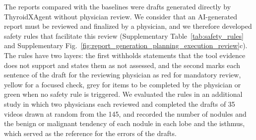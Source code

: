 \documentclass[fleqn,10pt]{wlscirep}
\begin{document}

The reports compared with the baselines were drafts generated directly by ThyroidXAgent without physician review. We consider that an AI-generated report must be reviewed and finalized by a physician, and we therefore developed safety rules that facilitate this review (Supplementary Table~\ref{tab:safety_rules} and Supplementary Fig.~\ref{fig:report_generation_planning_execution_review}c). The rules have two layers: the first withholds statements that the tool evidence does not support and states them as not assessed, and the second marks each sentence of the draft for the reviewing physician as red for mandatory review, yellow for a focused check, grey for items to be completed by the physician or green when no safety rule is triggered. We evaluated the rules in an additional study in which two physicians each reviewed and completed the drafts of 35 videos drawn at random from the 145, and recorded the number of nodules and the benign or malignant tendency of each nodule in each lobe and the isthmus, which served as the reference for the errors of the drafts.
\end{document}
